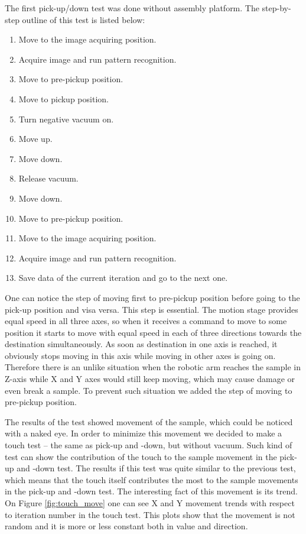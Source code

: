 The first pick-up/down test was done without assembly platform. The step-by-step outline of this test is listed below:
\begin{enumerate}
\setlength\itemsep{-0.5em}
\item Move to the image acquiring position.
\item Acquire image and run pattern recognition.
\item Move to pre-pickup position.
\item Move to pickup position.
\item Turn negative vacuum on.
\item Move up.
\item Move down.
\item Release vacuum.
\item Move down.
\item Move to pre-pickup position.
\item Move to the image acquiring position.
\item Acquire image and run pattern recognition.
\item Save data of the current iteration and go to the next one.
\end{enumerate}

One can notice the step of moving first to pre-pickup position before going to the pick-up position and visa versa. This step is essential. The motion stage provides equal speed in all three axes, so when it receives a command to move to some position it starts to move with equal speed in each of three directions towards the destination simultaneously. As soon as destination in one axis is reached, it obviously stops moving in this axis while moving in other axes is going on. Therefore there is an unlike situation when the robotic arm reaches the sample in Z-axis while X and Y axes would still keep moving, which may cause damage or even break a sample. To prevent such situation we added the step of moving to pre-pickup position.

The results of the test showed movement of the sample, which could be noticed with a naked eye. In order to minimize this movement we decided to make a touch test -- the same as pick-up and -down, but without vacuum. Such kind of test can show the contribution of the touch to the sample movement in the pick-up and -down test. The results if this test was quite similar to the previous test, which means that the touch itself contributes the most to the sample movements in the pick-up and -down test. The interesting fact of this movement is its trend. On Figure \ref{fig:touch_move} one can see X and Y movement trends with respect to iteration number in the touch test. This plots show that the movement is not random and it is more or less constant both in value and direction.

